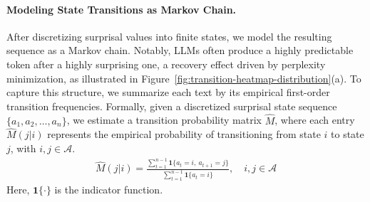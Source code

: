 \documentclass{article}
\theoremstyle{plain}
\theoremstyle{definition}
\theoremstyle{remark}
\begin{document}
\paragraph{Modeling State Transitions as Markov Chain.}
After discretizing surprisal values into finite states, we model the resulting sequence as a Markov chain. Notably, LLMs often produce a highly predictable token after a highly surprising one, a recovery effect driven by perplexity minimization, as illustrated in Figure~\ref{fig:transition-heatmap-distribution}(a). To capture this structure, we summarize each text by its empirical first-order transition frequencies. Formally, given a discretized surprisal state sequence $\{a_1, a_2, \dots, a_n\}$, we estimate a transition probability matrix $\hat M$, where each entry $\hat M(j|i)$ represents the empirical probability of transitioning from state $i$ to state $j$, with  $i,j \in \mathcal{A}$.
\begin{align}
   \hat M(j|i)=\frac{\sum_{t=1}^{n-1} \mathbf{1}\{a_t = i,\ a_{t+1} = j\}}{\sum_{t=1}^{n-1} \mathbf{1}\{a_t = i\}}, \quad i, j \in \mathcal{A} \label{eq:counts}
\end{align}
Here, $ \mathbf{1}\{\cdot\}$ is the indicator function.



\end{document}
